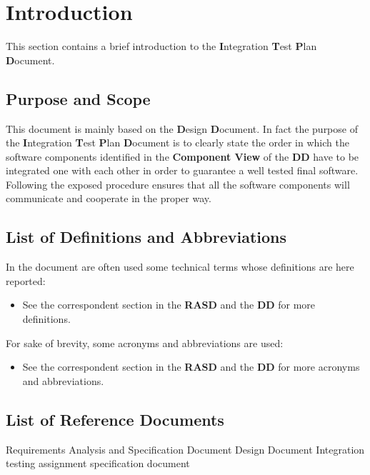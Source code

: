 \section{Introduction}
This section contains a brief introduction to the \textbf{I}ntegration \textbf{T}est \textbf{P}lan \textbf{D}ocument.
%
\subsection{Purpose and Scope}
This document is mainly based on the \textbf{D}esign \textbf{D}ocument. In fact the purpose of the \textbf{I}ntegration \textbf{T}est \textbf{P}lan \textbf{D}ocument is to clearly state the order in which the software components identified in the \textbf{Component View} of the \textbf{DD} have to be integrated one with each other in order to guarantee a well tested final software. Following the exposed procedure ensures that all the software components will communicate and cooperate in the proper way.
%
\subsection{List of Definitions and Abbreviations}
In the document are often used some technical terms whose definitions are here reported:
\begin{itemize}
	 An atomic procedure done to test the integration of a component on the top of another one.
	 A collection of \textbf{Integration Test Cases}.
	\item See the correspondent section in the \textbf{RASD} and the \textbf{DD} for more definitions.
\end{itemize}
For sake of brevity, some acronyms and abbreviations are used:
\begin{itemize}
	 Integration Test Suite number n.
	 Integration Test Case number m of the Integration Test Suite number n.
	 JavaScript.
	 User Interface.
	\item See the correspondent section in the \textbf{RASD} and the \textbf{DD} for more acronyms and abbreviations.
\end{itemize}
%
\subsection{List of Reference Documents}
\begin{itemize}
	 Requirements Analysis and Specification Document
	 Design Document
	 Integration testing assignment specification document
\end{itemize}
